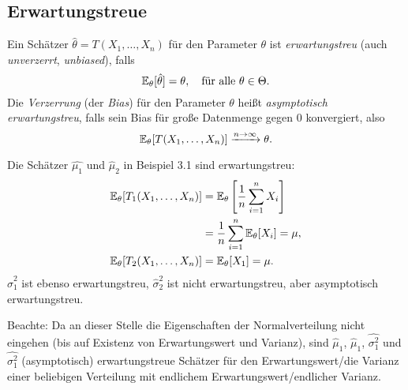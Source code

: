 \subsection{Erwartungstreue}
\begin{defn}
  Ein Schätzer $\hat{\theta} = T(X_1, \ldots, X_n)$ für den Parameter $\theta$
  ist \emph{erwartungstreu} (auch \emph{unverzerrt}, \emph{unbiased}), falls
  \[ \mathbb{E}_\theta[\hat{\theta}] = \theta, \quad \text{für alle } \theta \in \Theta. \]
  Die \emph{Verzerrung} (der \emph{Bias}) für den Parameter $\theta$ heißt
  \emph{asymptotisch erwartungstreu}, falls sein Bias für große Datenmenge
  gegen 0 konvergiert, also
  \[ \mathbb{E}_\theta[T(X_1, \ldots, X_n)] \xrightarrow{n \to \infty} \theta. \]
\end{defn}

\begin{exmp}
  Die Schätzer $\hat{\mu_1}$ und $\hat{\mu}_2$ in Beispiel 3.1 sind
  erwartungstreu:
  \[ \begin{aligned}
      \mathbb{E}_\theta[ T_1(X_1, \ldots, X_n) ]
      &= \mathbb{E}_\theta \left[ \frac{1}{n} \sum_{i=1}^n X_i \right] \\
      &= \frac{1}{n} \sum_{i=1}^n \mathbb{E}_\theta[X_i] = \mu, \\
      \mathbb{E}_\theta[ T_2(X_1, \ldots, X_n) ]
      &= \mathbb{E}_\theta[X_1] = \mu.
    \end{aligned}
  \]
  $\hat{\sigma}^2_1$ ist ebenso erwartungstreu, $\hat{\sigma}^2_2$ ist nicht
  erwartungstreu, aber asymptotisch erwartungstreu.

  Beachte: Da an dieser Stelle die Eigenschaften der Normalverteilung nicht
  eingehen (bis auf Existenz von Erwartungswert und Varianz), sind
  $\hat{\mu}_1$, $\hat{\mu}_1$, $\hat{\sigma^2_1}$ und $\hat{\sigma^2_1}$
  (asymptotisch) erwartungstreue Schätzer für den Erwartungswert/die Varianz
  einer beliebigen Verteilung mit endlichem Erwartungswert/endlicher Varianz.
\end{exmp}

